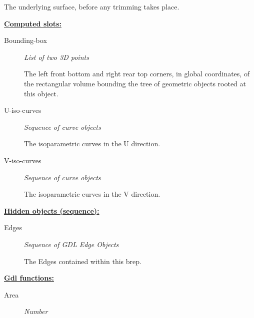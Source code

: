 \documentclass [11pt]{book}
\begin{document}
\begin{itemize}
\begin{description}
 The underlying surface, before any trimming takes place.




\end{description}






\textbf{
\underline{Computed slots:}}

\begin{description}

\item [Bounding-box]
\emph{List of two 3D points}

 The left front bottom and right rear top corners, in global coordinates,
of the rectangular volume bounding the tree of geometric objects rooted at this object.




\item [U-iso-curves]
\emph{Sequence of curve objects}

 The isoparametric curves in the U direction.




\item [V-iso-curves]
\emph{Sequence of curve objects}

 The isoparametric curves in the V direction.




\end{description}






\textbf{
\underline{Hidden objects (sequence):}}

\begin{description}

\item [Edges]
\emph{Sequence of GDL Edge Objects}

 The Edges contained within this brep.




\end{description}






\textbf{
\underline{Gdl functions:}}

\begin{description}

\item [Area]
\emph{Number}


\end{description}
\end{itemize}
\end{document}
